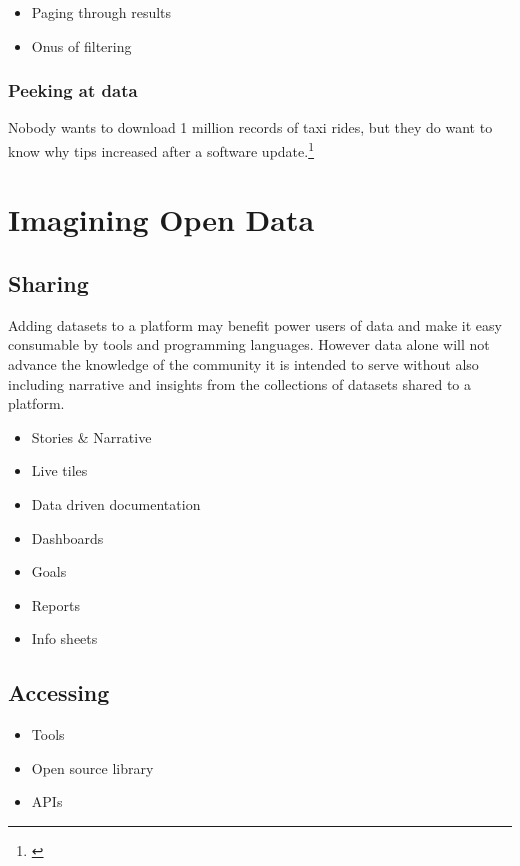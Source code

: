 \documentclass[
]{book}
\providecommand{\tightlist}{%
  \setlength{\itemsep}{0pt}\setlength{\parskip}{0pt}}
\begin{document}
\begin{itemize}
\tightlist
\item
  Paging through results
\item
  Onus of filtering
\end{itemize}

\hypertarget{peeking-at-data}{%
\subsection{Peeking at data}\label{peeking-at-data}}

Nobody wants to download 1 million records of taxi rides, but they do want to know why tips increased after a software update.\footnote{\citet{iquantny2020}}

\hypertarget{imagine}{%
\chapter{Imagining Open Data}\label{imagine}}

\hypertarget{sharing}{%
\section{Sharing}\label{sharing}}

Adding datasets to a platform may benefit power users of data and make it easy consumable by tools and programming languages. However data alone will not advance the knowledge of the community it is intended to serve without also including narrative and insights from the collections of datasets shared to a platform.

\begin{itemize}
\tightlist
\item
  Stories \& Narrative
\item
  Live tiles
\item
  Data driven documentation
\item
  Dashboards
\item
  Goals
\item
  Reports
\item
  Info sheets
\end{itemize}

\hypertarget{accessing}{%
\section{Accessing}\label{accessing}}

\begin{itemize}
\tightlist
\item
  Tools
\item
  Open source library
\item
  APIs
\end{itemize}
\end{document}
